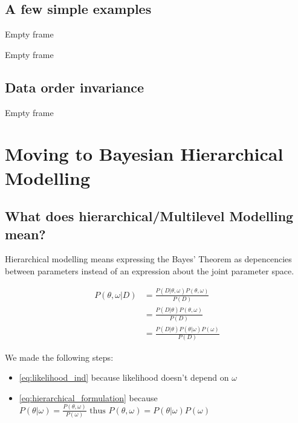 \documentclass[11pt]{beamer}
\begin{document}
\subsection{A few simple examples}
\begin{frame}
	Empty frame
\end{frame}

\begin{frame}
	Empty frame
\end{frame}


\subsection{Data order invariance}
\begin{frame}
	Empty frame
\end{frame}



\section{Moving to Bayesian Hierarchical Modelling}
\subsection{What does hierarchical/Multilevel Modelling mean?}
\begin{frame}
	Hierarchical modelling means expressing the Bayes' Theorem as depencencies between parameters instead of an expression about the joint parameter space.
	
	\begin{align}
		P(\theta, \omega | D) &= \frac{P(D | \theta, \omega) P(\theta, \omega)}{P(D)} \\
		&= \frac{P(D | \theta) P(\theta, \omega)}{P(D)} \label{eq:likelihood_ind}\\
		&= \frac{P(D | \theta) P(\theta | \omega) P(\omega)}{P(D)} \label{eq:hierarchical_formulation}
	\end{align}
	
	We made the following steps:
	\begin{itemize}
		\item \eqref{eq:likelihood_ind} because likelihood doesn't depend on $\omega$
		\item \eqref{eq:hierarchical_formulation} because $P(\theta | \omega) = \frac{P(\theta, \omega)}{P(\omega)} \text{ thus } P(\theta, \omega) = P(\theta | \omega) P(\omega)$
	\end{itemize}
\end{frame}
\end{document}
